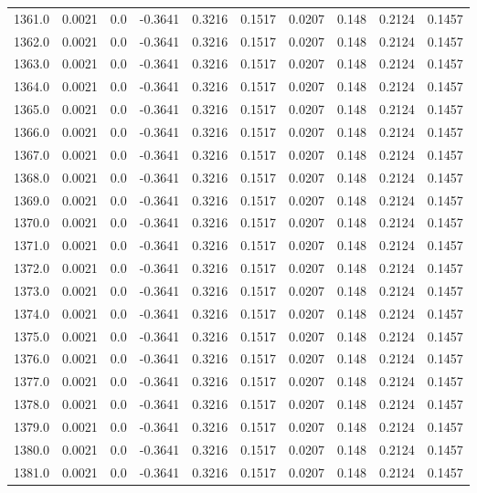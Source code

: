 \begin{longtable}{lrrrrrrrrr}
1361.0 & 0.0021 & 0.0 & -0.3641 & 0.3216 & 0.1517 & 0.0207 & 0.148 & 0.2124 & 0.1457 \\
1362.0 & 0.0021 & 0.0 & -0.3641 & 0.3216 & 0.1517 & 0.0207 & 0.148 & 0.2124 & 0.1457 \\
1363.0 & 0.0021 & 0.0 & -0.3641 & 0.3216 & 0.1517 & 0.0207 & 0.148 & 0.2124 & 0.1457 \\
1364.0 & 0.0021 & 0.0 & -0.3641 & 0.3216 & 0.1517 & 0.0207 & 0.148 & 0.2124 & 0.1457 \\
1365.0 & 0.0021 & 0.0 & -0.3641 & 0.3216 & 0.1517 & 0.0207 & 0.148 & 0.2124 & 0.1457 \\
1366.0 & 0.0021 & 0.0 & -0.3641 & 0.3216 & 0.1517 & 0.0207 & 0.148 & 0.2124 & 0.1457 \\
1367.0 & 0.0021 & 0.0 & -0.3641 & 0.3216 & 0.1517 & 0.0207 & 0.148 & 0.2124 & 0.1457 \\
1368.0 & 0.0021 & 0.0 & -0.3641 & 0.3216 & 0.1517 & 0.0207 & 0.148 & 0.2124 & 0.1457 \\
1369.0 & 0.0021 & 0.0 & -0.3641 & 0.3216 & 0.1517 & 0.0207 & 0.148 & 0.2124 & 0.1457 \\
1370.0 & 0.0021 & 0.0 & -0.3641 & 0.3216 & 0.1517 & 0.0207 & 0.148 & 0.2124 & 0.1457 \\
1371.0 & 0.0021 & 0.0 & -0.3641 & 0.3216 & 0.1517 & 0.0207 & 0.148 & 0.2124 & 0.1457 \\
1372.0 & 0.0021 & 0.0 & -0.3641 & 0.3216 & 0.1517 & 0.0207 & 0.148 & 0.2124 & 0.1457 \\
1373.0 & 0.0021 & 0.0 & -0.3641 & 0.3216 & 0.1517 & 0.0207 & 0.148 & 0.2124 & 0.1457 \\
1374.0 & 0.0021 & 0.0 & -0.3641 & 0.3216 & 0.1517 & 0.0207 & 0.148 & 0.2124 & 0.1457 \\
1375.0 & 0.0021 & 0.0 & -0.3641 & 0.3216 & 0.1517 & 0.0207 & 0.148 & 0.2124 & 0.1457 \\
1376.0 & 0.0021 & 0.0 & -0.3641 & 0.3216 & 0.1517 & 0.0207 & 0.148 & 0.2124 & 0.1457 \\
1377.0 & 0.0021 & 0.0 & -0.3641 & 0.3216 & 0.1517 & 0.0207 & 0.148 & 0.2124 & 0.1457 \\
1378.0 & 0.0021 & 0.0 & -0.3641 & 0.3216 & 0.1517 & 0.0207 & 0.148 & 0.2124 & 0.1457 \\
1379.0 & 0.0021 & 0.0 & -0.3641 & 0.3216 & 0.1517 & 0.0207 & 0.148 & 0.2124 & 0.1457 \\
1380.0 & 0.0021 & 0.0 & -0.3641 & 0.3216 & 0.1517 & 0.0207 & 0.148 & 0.2124 & 0.1457 \\
1381.0 & 0.0021 & 0.0 & -0.3641 & 0.3216 & 0.1517 & 0.0207 & 0.148 & 0.2124 & 0.1457 \\

\end{longtable}
